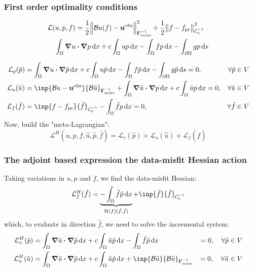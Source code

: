 \documentclass[
  pdf,
  10pt,
  xcolor={svgnames},
]{beamer}
\newcommand{\mc}[1]{\mathcal{#1}}
\newcommand{\mat}[1]{\mathbf{{#1}}}
\newcommand{\obs}{\mathbf{u}^{\rm obs}}
\newcommand{\Gnoise}{\mat{\Gamma}_{\rm noise}}
\begin{document}
\begin{frame}
  \frametitle{First order optimality conditions}
  \begin{block}{}
    \begin{align*}
       & \mc{L}(u,p,f)
      = \frac{1}{2} \norm{\mc{B}u(f) - \obs}_{\Gnoise^{-1}}^2
      + \frac{1}{2} \norm{f - f_{\rm pr}}_{\mc{C}_0^{-1}}^2 \\
       & \quad
      \int_\Omega \grad u \vdot \grad p \dd{x}
      + c \int_\Omega up \dd{x}
      - \int_\Omega fp \dd{x}
      - \int_{\partial\Omega} gp \dd{s}
    \end{align*}
  \end{block}
  \begin{align*}
    \mc{L}_p(\tilde{p})
     & =
    \int_\Omega \grad u \vdot \grad \tilde{p} \dd{x}
    + c \int_\Omega u\tilde{p} \dd{x}
    - \int_\Omega f\tilde{p} \dd{x}
    - \int_{\partial\Omega} g\tilde{p} \dd{s}
    = 0,
     & \forall \tilde{p} \in V \\
    \mc{L}_u(\tilde{u})
     & =
    \inp{\mc{B}u - \obs}{\mc{B}\tilde{u}}_{\Gnoise^{-1}}
    + \int_\Omega \grad \tilde{u} \vdot \grad p \dd{x}
    + c \int_\Omega \tilde{u}p \dd{x}
    = 0,
     & \forall \tilde{u} \in V \\
    \mc{L}_f(\tilde{f})
     & =
    \inp{f - f_{\rm pr}}{\tilde{f}}_{\mc{C}_0^{-1}}
    - \int_\Omega \tilde{f} p \dd{x}
    = 0,
     & \forall \tilde{f} \in V
  \end{align*}
  \pause
  Now, build the "meta-Lagrangian":
  \[
    \mc{L}^H(u,p,f,\hat{u},\hat{p},\hat{f})
    = \mc{L}_v(\hat{p})
    + \mc{L}_u(\hat{u})
    + \mc{L}_f(\hat{f})
  \]
\end{frame}

\begin{frame}
  \frametitle{The adjoint based expression the data-misfit Hessian action}
  Taking variations in $u,p$ and $f$, we find the data-misfit Hessian:
  \[
    \mc{L}^H_f(\tilde{f})
    =
    \underbrace{
      - \int_\Omega \tilde{f} \hat{p} \dd{x}
    }_{\mc{H}(f)(\hat{f},\tilde{f})}
    + \inp{\tilde{f}}{\hat{f}}_{\mc{C}_0^{-1}}
  \]
  which, to evaluate in direction $\hat{f}$, we need to solve the incremental
  system:
  \begin{align*}
    \mc{L}^H_v(\tilde{p})
     & =
    \int_\Omega \grad \hat{u} \vdot \grad \tilde{p} \dd{x}
    + c\int_\Omega \hat{u} \tilde{p} \dd{x}
    - \int_\Omega \hat{f} \tilde{p} \dd{x}
     & = 0, \quad \forall \tilde{p} \in V \\
    \mc{L}^H_u(\tilde{u})
     & =
    \int_\Omega \grad \tilde{u} \vdot \grad \hat{p} \dd{x}
    + c \int_\Omega \tilde{u} \hat{p} \dd{x}
    + \inp{\mc{B} \tilde{u}}{\mc{B}\hat{u}}_{\Gnoise^{-1}}
     & = 0, \quad \forall \tilde{u} \in V
  \end{align*}
\end{frame}
\end{document}
